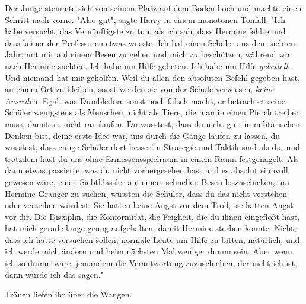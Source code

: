 {Der Junge stemmte sich von seinem Platz auf dem Boden hoch und machte einen Schritt nach vorne. "Also gut", sagte Harry in einem monotonen Tonfall. "Ich habe versucht, das Vernünftigste zu tun, als ich sah, dass Hermine fehlte und dass keiner der Professoren etwas wusste. Ich bat einen Schüler aus dem siebten Jahr, mit mir auf einem Besen zu gehen und mich zu beschützen, während wir nach Hermine suchten. Ich habe um Hilfe gebeten. Ich habe um Hilfe \emph{gebettelt}. Und niemand hat mir geholfen. Weil du allen den absoluten Befehl gegeben hast, an einem Ort zu bleiben, sonst werden sie von der Schule verwiesen, \emph{keine Ausrede}n. Egal, was Dumbledore sonst noch falsch macht, er betrachtet seine Schüler wenigstens als Menschen, nicht als Tiere, die man in einen Pferch treiben muss, damit sie nicht rauslaufen. Du wusstest, dass du nicht gut im militärischen Denken bist, deine erste Idee war, uns durch die Gänge laufen zu lassen, du wusstest, dass einige Schüler dort besser in Strategie und Taktik sind als du, und trotzdem hast du uns ohne Ermessensspielraum in einem Raum festgenagelt. Als dann etwas passierte, was du nicht vorhergesehen hast und es absolut sinnvoll gewesen wäre, einen Siebtklässler auf einem schnellen Besen loszuschicken, um Hermine Granger zu suchen, wussten die Schüler, dass du das nicht verstehen oder verzeihen würdest. Sie hatten keine Angst vor dem Troll, sie hatten Angst vor dir. Die Disziplin, die Konformität, die Feigheit, die du ihnen eingeflößt hast, hat mich gerade lange genug aufgehalten, damit Hermine sterben konnte. Nicht, dass ich hätte versuchen sollen, normale Leute um Hilfe zu bitten, natürlich, und ich werde mich ändern und beim nächsten Mal weniger dumm sein. Aber wenn ich so dumm wäre, jemandem die Verantwortung zuzuschieben, der nicht ich ist, dann würde ich das sagen."

Tränen liefen ihr über die Wangen.

}
